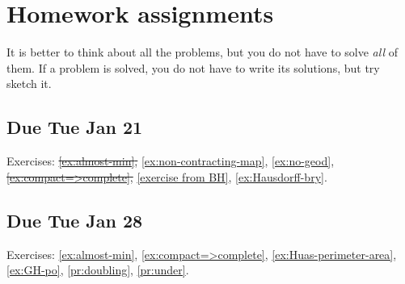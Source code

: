 \addtocounter{chapter}{-1}
\chapter{Homework assignments}


It is better to think about all the problems, but you do not have to solve \emph{all} of them.
If a problem is solved, you do not have to write its solutions, but try sketch it.

\section{Due Tue Jan 21}

Exercises: \sout{\ref{ex:almost-min},} \ref{ex:non-contracting-map}, \ref{ex:no-geod}, \sout{\ref{ex:compact=>complete},} \ref{exercise from BH}, \ref{ex:Hausdorff-bry}.

\section{Due Tue Jan 28}

Exercises: \ref{ex:almost-min},  \ref{ex:compact=>complete}, \ref{ex:Huas-perimeter-area}, \ref{ex:GH-po}, \ref{pr:doubling}, \ref{pr:under}.

